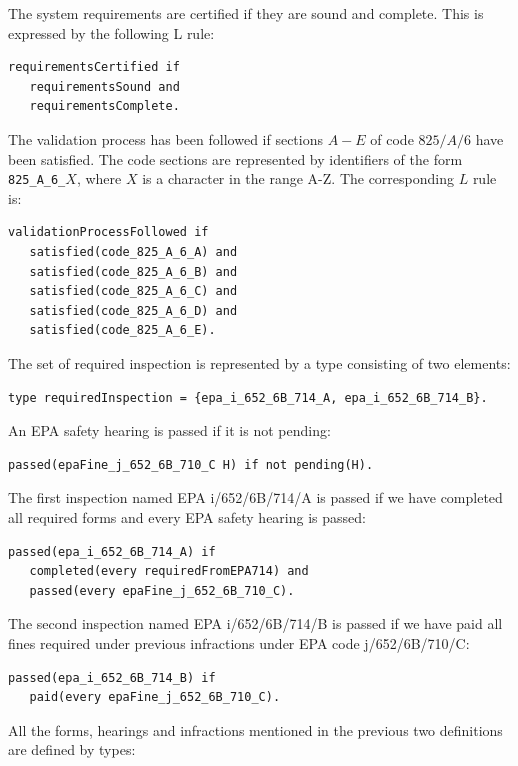 \documentclass[a4paper,10pt]{article}
\begin{document}
\medskip\noindent
The system requirements are certified if they are sound and complete. This is expressed by the following L rule:

\begin{verbatim}
requirementsCertified if
   requirementsSound and
   requirementsComplete.
\end{verbatim}

\medskip\noindent
The validation process has been followed if sections $A-E$ of code  $825/A/6$ have been satisfied. The code sections are represented by identifiers of the form \texttt{825\_A\_6\_}$X$, where $X$ is a character in the range A-Z. The corresponding $L$ rule is:

\begin{verbatim}
validationProcessFollowed if
   satisfied(code_825_A_6_A) and
   satisfied(code_825_A_6_B) and
   satisfied(code_825_A_6_C) and
   satisfied(code_825_A_6_D) and
   satisfied(code_825_A_6_E).
\end{verbatim}


\medskip\noindent
The set of required inspection is represented by a type consisting of two elements:
\begin{verbatim}
type requiredInspection = {epa_i_652_6B_714_A, epa_i_652_6B_714_B}.
\end{verbatim} 

An EPA safety hearing is passed if it is not pending:
\begin{verbatim}
passed(epaFine_j_652_6B_710_C H) if not pending(H).
\end{verbatim}
 
\medskip\noindent
The first inspection named EPA i/652/6B/714/A is  passed if we have completed all 
   required forms and every EPA safety hearing is passed:

\begin{verbatim}
passed(epa_i_652_6B_714_A) if
   completed(every requiredFromEPA714) and
   passed(every epaFine_j_652_6B_710_C).
\end{verbatim}

\medskip\noindent
The second inspection named  EPA i/652/6B/714/B is passed if we have paid all fines 
required under previous infractions under EPA code j/652/6B/710/C:

\begin{verbatim}
passed(epa_i_652_6B_714_B) if
   paid(every epaFine_j_652_6B_710_C).
\end{verbatim}

\medskip\noindent
All the forms, hearings and infractions mentioned in the previous two definitions are defined by types:
\end{document}
